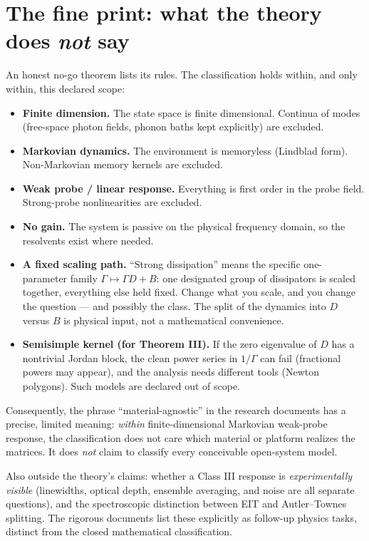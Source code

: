 \documentclass[11pt]{article}
\begin{document}
\section{The fine print: what the theory does \emph{not} say}
\label{sec:scope}

An honest no-go theorem lists its rules.  The classification holds within,
and only within, this declared scope:

\begin{itemize}
\item[(A1)] \textbf{Finite dimension.}  The state space is finite
dimensional.  Continua of modes (free-space photon fields, phonon baths kept
explicitly) are excluded.
\item[(A2)] \textbf{Markovian dynamics.}  The environment is memoryless
(Lindblad form).  Non-Markovian memory kernels are excluded.
\item[(A3)] \textbf{Weak probe / linear response.}  Everything is first
order in the probe field.  Strong-probe nonlinearities are excluded.
\item[(A4)] \textbf{No gain.}  The system is passive on the physical
frequency domain, so the resolvents exist where needed.
\item[(A5)] \textbf{A fixed scaling path.}  ``Strong dissipation'' means the
specific one-parameter family $\Gamma\mapsto\Gamma D+B$: one designated
group of dissipators is scaled together, everything else held fixed.
Change what you scale, and you change the question --- and possibly the
class.  The split of the dynamics into $D$ versus $B$ is physical input,
not a mathematical convenience.
\item[(A6)] \textbf{Semisimple kernel (for Theorem III).}  If the zero
eigenvalue of $D$ has a nontrivial Jordan block, the clean power series in
$1/\Gamma$ can fail (fractional powers may appear), and the analysis needs
different tools (Newton polygons).  Such models are declared out of scope.
\end{itemize}

Consequently, the phrase ``material-agnostic'' in the research documents has
a precise, limited meaning: \emph{within} finite-dimensional Markovian
weak-probe response, the classification does not care which material or
platform realizes the matrices.  It does \emph{not} claim to classify every
conceivable open-system model.

\begin{sloppypar}
Also outside the theory's claims: whether a Class III response is
\emph{experimentally visible} (linewidths, optical depth, ensemble
averaging, and noise are all separate questions), and the spectroscopic
distinction between EIT and Autler--Townes splitting.  The rigorous
documents list these explicitly as follow-up physics tasks, distinct from
the closed mathematical classification.
\end{sloppypar}
\end{document}

